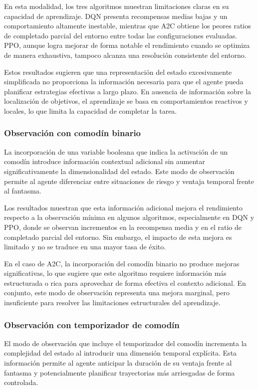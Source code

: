 En esta modalidad, los tres algoritmos muestran limitaciones claras en su capacidad de aprendizaje. DQN presenta recompensas medias bajas y un comportamiento altamente inestable, mientras que A2C obtiene los peores ratios de completado parcial del entorno entre todas las configuraciones evaluadas. PPO, aunque logra mejorar de forma notable el rendimiento cuando se optimiza de manera exhaustiva, tampoco alcanza una resolución consistente del entorno.

Estos resultados sugieren que una representación del estado excesivamente simplificada no proporciona la información necesaria para que el agente pueda planificar estrategias efectivas a largo plazo. En ausencia de información sobre la localización de objetivos, el aprendizaje se basa en comportamientos reactivos y locales, lo que limita la capacidad de completar la tarea.

\subsubsection{Observación con comodín binario}

La incorporación de una variable booleana que indica la activación de un comodín introduce información contextual adicional sin aumentar significativamente la dimensionalidad del estado. Este modo de observación permite al agente diferenciar entre situaciones de riesgo y ventaja temporal frente al fantasma.

Los resultados muestran que esta información adicional mejora el rendimiento respecto a la observación mínima en algunos algoritmos, especialmente en DQN y PPO, donde se observan incrementos en la recompensa media y en el ratio de completado parcial del entorno. Sin embargo, el impacto de esta mejora es limitado y no se traduce en una mayor tasa de éxito.

En el caso de A2C, la incorporación del comodín binario no produce mejoras significativas, lo que sugiere que este algoritmo requiere información más estructurada o rica para aprovechar de forma efectiva el contexto adicional. En conjunto, este modo de observación representa una mejora marginal, pero insuficiente para resolver las limitaciones estructurales del aprendizaje.

\subsubsection{Observación con temporizador de comodín}

El modo de observación que incluye el temporizador del comodín incrementa la complejidad del estado al introducir una dimensión temporal explícita. Esta información permite al agente anticipar la duración de su ventaja frente al fantasma y potencialmente planificar trayectorias más arriesgadas de forma controlada.

